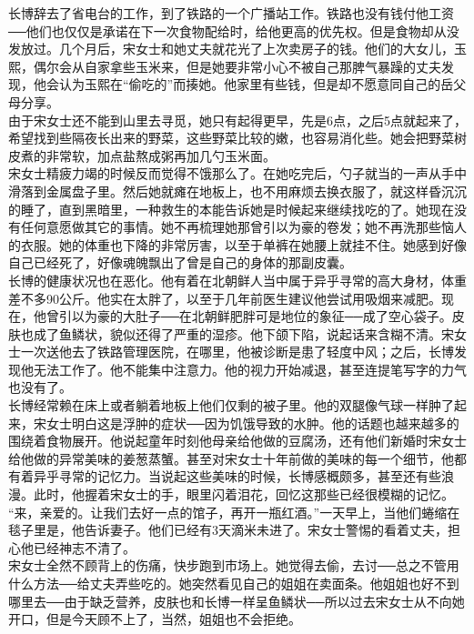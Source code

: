 长博辞去了省电台的工作，到了铁路的一个广播站工作。铁路也没有钱付他工资──他们也仅仅是承诺在下一次食物配给时，给他更高的优先权。但是食物却从没发放过。几个月后，宋女士和她丈夫就花光了上次卖房子的钱。他们的大女儿，玉熙，偶尔会从自家拿些玉米来，但是她要非常小心不被自己那脾气暴躁的丈夫发现，他会认为玉熙在“偷吃的”而揍她。他家里有些钱，但是却不愿意同自己的岳父母分享。\\

由于宋女士还不能到山里去寻觅，她只有起得更早，先是6点，之后5点就起来了，希望找到些隔夜长出来的野菜，这些野菜比较的嫩，也容易消化些。她会把野菜树皮煮的非常软，加点盐熬成粥再加几勺玉米面。\\

宋女士精疲力竭的时候反而觉得不饿那么了。在她吃完后，勺子就当的一声从手中滑落到金属盘子里。然后她就瘫在地板上，也不用麻烦去换衣服了，就这样昏沉沉的睡了，直到黑暗里，一种救生的本能告诉她是时候起来继续找吃的了。她现在没有任何意愿做其它的事情。她不再梳理她那曾引以为豪的卷发；她不再洗那些恼人的衣服。她的体重也下降的非常厉害，以至于单裤在她腰上就挂不住。她感到好像自己已经死了，好像魂魄飘出了曾是自己的身体的那副皮囊。\\

长博的健康状况也在恶化。他有着在北朝鲜人当中属于异乎寻常的高大身材，体重差不多90公斤。他实在太胖了，以至于几年前医生建议他尝试用吸烟来减肥。现在，他曾引以为豪的大肚子──在北朝鲜肥胖可是地位的象征──成了空心袋子。皮肤也成了鱼鳞状，貌似还得了严重的湿疹。他下颌下陷，说起话来含糊不清。宋女士一次送他去了铁路管理医院，在哪里，他被诊断是患了轻度中风；之后，长博发现他无法工作了。他不能集中注意力。他的视力开始减退，甚至连提笔写字的力气也没有了。\\

长博经常赖在床上或者躺着地板上他们仅剩的被子里。他的双腿像气球一样肿了起来，宋女士明白这是浮肿的症状──因为饥饿导致的水肿。他的话题也越来越多的围绕着食物展开。他说起童年时刻他母亲给他做的豆腐汤，还有他们新婚时宋女士给他做的异常美味的姜葱蒸蟹。甚至对宋女士十年前做的美味的每一个细节，他都有着异乎寻常的记忆力。当说起这些美味的时候，长博感概颇多，甚至还有些浪漫。此时，他握着宋女士的手，眼里闪着泪花，回忆这那些已经很模糊的记忆。\\

“来，亲爱的。让我们去好一点的馆子，再开一瓶红酒。”一天早上，当他们蜷缩在毯子里是，他告诉妻子。他们已经有3天滴米未进了。宋女士警惕的看着丈夫，担心他已经神志不清了。\\

宋女士全然不顾背上的伤痛，快步跑到市场上。她觉得去偷，去讨──总之不管用什么方法──给丈夫弄些吃的。她突然看见自己的姐姐在卖面条。他姐姐也好不到哪里去──由于缺乏营养，皮肤也和长博一样呈鱼鳞状──所以过去宋女士从不向她开口，但是今天顾不上了，当然，姐姐也不会拒绝。\\

